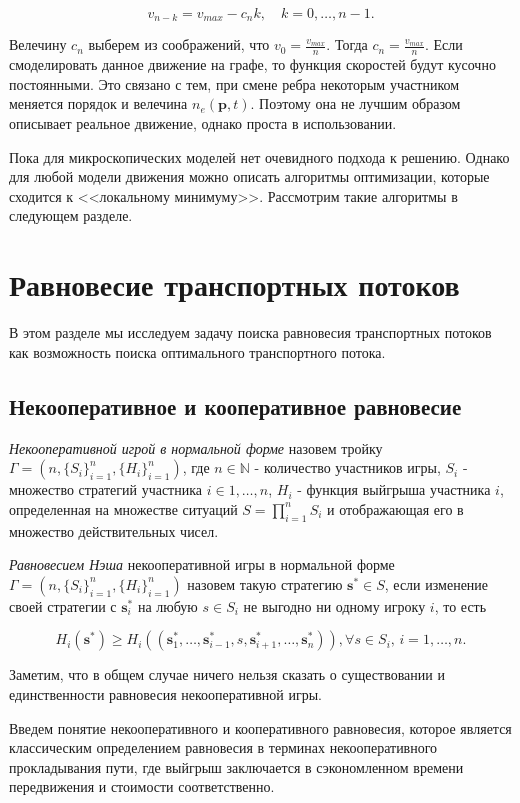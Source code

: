 \documentclass[12pt, a4paper]{article}
\begin{document}
$$v_{n - k} = v_{max} - c_n k, \quad k = 0, \dots, n - 1.$$

Велечину $c_n$ выберем из соображений, что $v_0 = \frac{v_{max}}{n}$. Тогда $c_n = \frac{v_{max}}{n}$. Если смоделировать данное движение на графе, то функция скоростей будут кусочно постоянными. Это связано с тем, при смене ребра некоторым участником меняется порядок и велечина $n_e(\textbf{p}, t)$. Поэтому она не лучшим образом описывает реальное движение, однако проста в использовании.

Пока для микроскопических моделей нет очевидного подхода к решению. Однако для любой модели движения можно описать алгоритмы оптимизации, которые сходится к <<локальному минимуму>>. Рассмотрим такие алгоритмы в следующем разделе.

\newpage
\section{Равновесие транспортных потоков}
\label{sec:rovn}
В этом разделе мы исследуем задачу поиска равновесия транспортных потоков как возможность поиска оптимального транспортного потока.

\subsection{Некооперативное и кооперативное равновесие}

\textit{Некооперативной игрой в нормальной форме} назовем тройку $\Gamma = (n, \{S_i\}_{i = 1}^n, \{H_i\}_{i = 1}^n)$, где $n \in \mathbb{N}$ - количество участников игры, $S_i$ - множество стратегий участника $i \in {1, \dots, n}$, $H_i$ - функция выйгрыша участника $i$, определенная на множестве ситуаций $S = \prod\limits_{i = 1}^n S_i$ и отображающая его в множество действительных чисел.

\textit{Равновесием Нэша} некооперативной игры в нормальной форме $\Gamma = (n, \{S_i\}_{i = 1}^n, \{H_i\}_{i = 1}^n)$ назовем такую стратегию $\textbf{s}^* \in S$, если изменение своей стратегии с $\textbf{s}_i^*$ на любую $s \in S_i$ не выгодно ни одному игроку $i$, то есть

$$H_i(\textbf{s}^*) \ge H_i(\left(\textbf{s}^*_1, \ldots, \textbf{s}^*_{i - 1}, s, \textbf{s}^*_{i + 1}, \ldots, \textbf{s}^*_{n} \right)), \forall s \in S_i, \, i = 1, \dots, n. $$ 

Заметим, что в общем случае ничего нельзя сказать о существовании и единственности равновесия некооперативной игры.

Введем понятие некооперативного и кооперативного равновесия, которое является классическим определением равновесия в терминах некооперативного прокладывания пути, где выйгрыш заключается в сэкономленном времени передвижения и стоимости соответственно.
\end{document}
